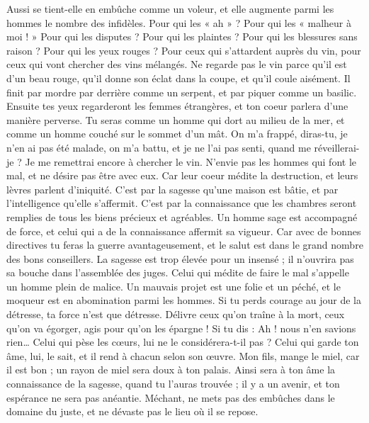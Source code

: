 \begin{multicols}{2}
Aussi se tient-elle en embûche comme un voleur, et elle augmente parmi les hommes le nombre des infidèles.
Pour qui les « ah » ? Pour qui les « malheur à moi ! » Pour qui les disputes ? Pour qui les plaintes ? Pour qui les blessures sans raison ? Pour qui les yeux rouges ?
Pour ceux qui s'attardent auprès du vin, pour ceux qui vont chercher des vins mélangés.
Ne regarde pas le vin parce qu’il est d’un beau rouge, qu’il donne son éclat dans la coupe, et qu'il coule aisément.
Il finit par mordre par derrière comme un serpent, et par piquer comme un basilic.
Ensuite tes yeux regarderont les femmes étrangères, et ton coeur parlera d’une manière perverse.
Tu seras comme un homme qui dort au milieu de la mer, et comme un homme couché sur le sommet d’un mât.
On m'a frappé, diras-tu, je n'en ai pas été malade, on m'a battu, et je ne l'ai pas senti, quand me réveillerai-je ? Je me remettrai encore à chercher le vin.
\VerseOne{}N'envie pas les hommes qui font le mal, et ne désire pas être avec eux.
Car leur coeur médite la destruction, et leurs lèvres parlent d’iniquité.
C’est par la sagesse qu’une maison est bâtie, et par l'intelligence qu’elle s’affermit.
C’est par la connaissance que les chambres seront remplies de tous les biens précieux et agréables.
Un homme sage est accompagné de force, et celui qui a de la connaissance affermit sa vigueur.
Car avec de bonnes directives tu feras la guerre avantageusement, et le salut est dans le grand nombre des bons conseillers.
La sagesse est trop élevée pour un insensé ; il n'ouvrira pas sa bouche dans l’assemblée des juges.
Celui qui médite de faire le mal s’appelle un homme plein de malice.
Un mauvais projet est une folie et un péché, et le moqueur est en abomination parmi les hommes.
Si tu perds courage au jour de la détresse, ta force n'est que détresse.
Délivre ceux qu’on traîne à la mort, ceux qu’on va égorger, agis pour qu’on les épargne !
Si tu dis : Ah ! nous n’en savions rien… Celui qui pèse les cœurs, lui ne le considérera-t-il pas ? Celui qui garde ton âme, lui, le sait, et il rend à chacun selon son œuvre.
Mon fils, mange le miel, car il est bon ; un rayon de miel sera doux à ton palais.
Ainsi sera à ton âme la connaissance de la sagesse, quand tu l'auras trouvée ; il y a un avenir, et ton espérance ne sera pas anéantie.
Méchant, ne mets pas des embûches dans le domaine du juste, et ne dévaste pas le lieu où il se repose.

\end{multicols}

